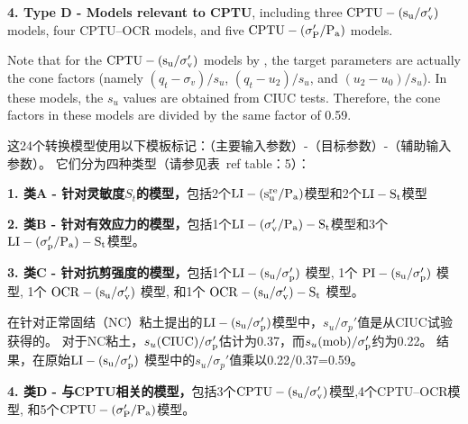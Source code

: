\begin{Parallel}{0.60\textwidth}{}
{        \textbf{4. Type D - Models relevant to CPTU}, including three $\rm{CPTU}-(s_u/\sigma_v')$ models, four CPTU–OCR models, \quad and five $\rm{CPTU-(\sigma_P'/P_a)}$ models. 
        
        Note that for the $\rm{CPTU}-(s_u/\sigma_v')$ models by \citet{Ching201252}, the target parameters are actually the cone factors (namely $(q_t-\sigma_v)/s_u$, $(q_t-u_2)/s_u$, and $(u_2-u_0)/s_u$). In these models, the $s_u$ values are obtained from CIUC tests. Therefore, the cone factors in these models are divided by the same factor of 0.59.
    }
    \ParallelRText
    {
        这24个转换模型使用以下模板标记：（主要输入参数）-（目标参数）-（辅助输入参数）。 它们分为四种类型（请参见表\ ref {table：5}）：

        \textbf{1. 类A - 针对灵敏度$S_t$的模型，}包括2个$\rm{LI}-(s_u^{re}/P_a)$模型和2个$\rm{LI}-S_t$模型

        \textbf{2. 类B  - 针对有效应力的模型，}包括1个$\rm{LI}-(\sigma_v'/P_a)-S_t$模型和3个$\rm{LI}-(\sigma_p'/P_a)-S_t$模型。

        \textbf{3. 类C - 针对抗剪强度的模型，}包括1个$\rm{LI}-(s_u/\sigma_p')$ 模型, 1个 $\rm{PI}-(s_u/\sigma_p')$ 模型, 1个 $\rm{OCR}-(s_u/\sigma_v')$ 模型, 和1个 $\rm{OCR}-(s_u/\sigma_v')-S_t$ 模型。

        在\citet{Bjerrum1960711}针对正常固结（NC）粘土提出的$\rm{LI}-(s_u/\sigma_p')$模型中，$s_u/\sigma_p'$值是从CIUC试验获得的。 对于NC粘土，$s_u(\rm{CIUC})/\sigma_p'$估计为0.37，而$s_u(\rm{mob})/\sigma_p'$约为0.22\citep{Mesri1975409}。 结果，\citet{Bjerrum1960711}在原始$\rm{LI}-(s_u/\sigma_p')$ 模型中的$s_u/\sigma_p'$值乘以0.22/0.37=0.59。

        \textbf{4. 类D - 与CPTU相关的模型，}包括3个$\rm{CPTU}-(s_u/\sigma_v')$模型,4个CPTU–OCR模型, 和5个$\rm{CPTU-(\sigma_P'/P_a)}$模型。

}
\end{Parallel}
